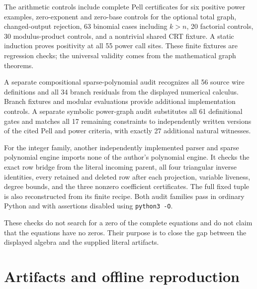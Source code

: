 \documentclass[11pt,letterpaper]{article}
\newcommand{\file}[1]{\nolinkurl{#1}}
\begin{document}
The arithmetic controls include complete Pell certificates for six
positive power examples, zero-exponent and zero-base controls for the
optional total graph, changed-output rejection, 63 binomial cases
including $k>n$, 20 factorial controls, 30 modulus-product controls,
and a nontrivial shared CRT fixture. A static induction proves positivity
at all 55 power call sites. These finite fixtures are regression checks;
the universal validity comes from the mathematical graph theorems.

A separate compositional sparse-polynomial audit recognizes all 56
source wire definitions and all 34 branch residuals from the displayed
numerical calculus. Branch fixtures and modular evaluations provide
additional implementation controls. A separate symbolic power-graph
audit substitutes all 61 definitional gates and matches all 17 remaining
constraints to independently written versions of the cited Pell and
power criteria, with exactly 27 additional natural witnesses.

For the integer family, another independently implemented parser and
sparse polynomial engine imports none of the author's polynomial engine.
It checks the exact row bridge from the literal incoming parent, all four
triangular inverse identities, every retained and deleted row after each
projection, variable liveness, degree bounds, and the three nonzero
coefficient certificates. The full fixed tuple is also reconstructed
from its finite recipe. Both audit families pass in ordinary Python and
with assertions disabled using \file{python3 -O}.

These checks do not search for a zero of the complete equations and do
not claim that the equations have no zeros. Their purpose is to close
the gap between the displayed algebra and the supplied literal artifacts.

\section{Artifacts and offline reproduction}
\end{document}

